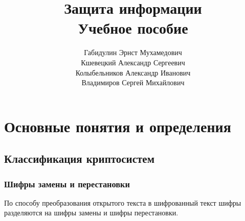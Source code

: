 \documentclass[10pt,a4paper]{book}
\begin{document}


\title{Защита информации \\ Учебное пособие}
\author{Габидулин Эрнст Мухамедович \\ Кшевецкий Александр Сергеевич \\ Колыбельников Александр Иванович \\ Владимиров Сергей Михайлович}
\date{
}
\maketitle
\setcounter{page}{3}

\newpage
\setcounter{tocdepth}{2}
\tableofcontents
\newpage




\chapter{Основные понятия и определения}





\section{Классификация криптосистем}



\subsection{Шифры замены и перестановки}

По способу преобразования открытого текста в шифрованный текст шифры разделяются на шифры замены и шифры перестановки.


\end{document}
